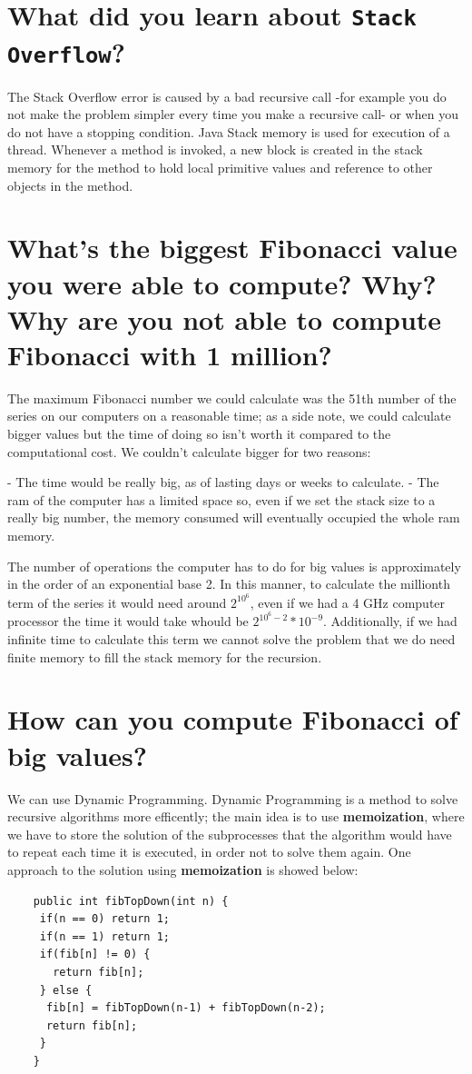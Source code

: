 \documentclass[a4paper,12pt]{article}
\begin{document}
    \section{What did you learn about \texttt{Stack Overflow}?}
      The Stack Overflow error is caused by a bad recursive call -for example you do not make
      the problem simpler every time you make a recursive call- or when you do not have a stopping
      condition.\cite{StackOverflow} Java Stack memory is used for execution of a thread.
      Whenever a method is invoked, a new block is created in the stack memory for the method to hold
      local primitive values and reference to other objects in the method.\cite{HeapStack}
    \section{What's the biggest Fibonacci value you were able to compute? Why? Why are you not able to compute Fibonacci with 1 million?}
    The maximum Fibonacci number we could calculate was the 51th number of the series on our computers on
    a reasonable time; as a side note, we could calculate bigger values but the time of doing so isn't worth
    it compared to the computational cost. We couldn't calculate bigger for two reasons:

    - The time would be really big, as of lasting days or weeks to calculate.
    - The ram of the computer has a limited space so, even if we set the stack size to a really big
    number, the memory consumed will eventually occupied the whole ram memory.

    The number of operations the computer has to do for big values is approximately in the order of
    an exponential base 2. In this manner, to calculate the millionth term of the series it would need
    around $2^{10^6}$, even if we had a 4 GHz computer processor the time it would take whould be
    $2^{10^6-2}*10^{-9}$. Additionally, if we had infinite time to calculate this term we cannot solve the
    problem that we do need finite memory to fill the stack memory for the recursion.

    \section{How can you compute Fibonacci of big values?}
    We can use Dynamic Programming. Dynamic Programming is a method to solve recursive algorithms more efficently;
    the main idea is to use \textbf{memoization}, where we have to store the solution of the subprocesses that the
    algorithm would have to repeat each time it is executed, in order not to solve them again. One approach to the
    solution using \textbf{memoization} is showed below: \cite{SJ}
    \begin{Verbatim}
    public int fibTopDown(int n) {
     if(n == 0) return 1;
     if(n == 1) return 1;
     if(fib[n] != 0) {
       return fib[n];
     } else {
      fib[n] = fibTopDown(n-1) + fibTopDown(n-2);
  	  return fib[n];
     }
    }
    \end{Verbatim}
\end{document}
